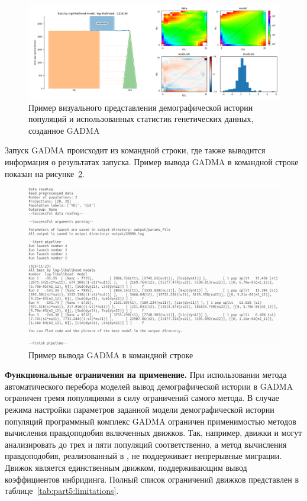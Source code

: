 \begin{figure}[!htbp]
    \centering
    \includegraphics[width=\linewidth]{images/part5/example_model_plot_demes.png}
    \caption{Пример визуального представления демографической истории популяций и использованных статистик генетических данных, созданное GADMA}
    \label{fig:part5:png_plot}
\end{figure}

Запуск GADMA происходит из командной строки, где также выводится информация о результатах запуска.
Пример вывода GADMA в командной строке показан на рисунке~\ref{fig:part5:output_example}.

\begin{figure}[!htbp]
    \centering
    \includegraphics[width=\linewidth]{images/part5/output_example.png}
    \caption{Пример вывода GADMA в командной строке}
    \label{fig:part5:output_example}
\end{figure}

\FloatBarrier
\textbf{Функциональные ограничения на применение.}
При использовании метода автоматического перебора моделей вывод демографической истории в GADMA ограничен тремя популяциями в силу ограничений самого метода.
В случае режима настройки параметров заданной модели демографической истории популяций программный комплекс GADMA ограничен применимостью методов вычисления правдоподобия включенных движков.
Так, например, движки \dadi и \moments могут анализировать до трех и пяти популяций соответственно, а метод вычисления правдоподобия, реализованный в \momi, не поддерживает непрерывные миграции.
Движок \dadi является единственным движком, поддерживающим вывод коэффициентов инбридинга.
Полный список ограничений движков представлен в таблице~\ref{tab:part5:limitations}.

